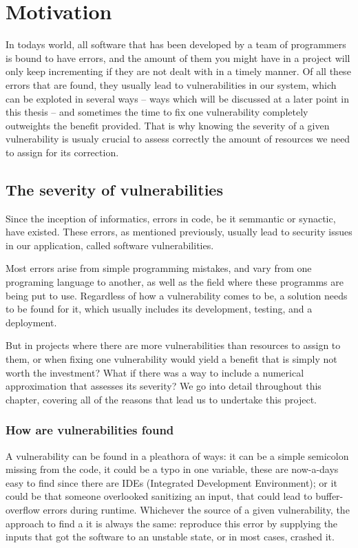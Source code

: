 
\chapter{Motivation}\label{chapter:Motivation}

In todays world, all software that has been developed by a team of programmers is bound to have errors, and the amount of them you might have in a project will only keep incrementing if they are not dealt with in a timely manner. Of all these errors that are found, they usually lead to vulnerabilities in our system, which can be exploted in several ways -- ways which will be discussed at a later point in this thesis -- and sometimes the time to fix one vulnerability completely outweights the benefit provided. That is why knowing the severity of a given vulnerability is usualy crucial to assess correctly the amount of resources we need to assign for its correction.

\section{The severity of vulnerabilities}
Since the inception of informatics, errors in code, be it semmantic or synactic, have existed. These errors, as mentioned previously, usually lead to security issues in our application, called software vulnerabilities.

Most errors arise from simple programming mistakes, and vary from one programing language to another, as well as the field where these programms are being put to use. Regardless of how a vulnerability comes to be, a solution needs to be found for it, which usually includes its development, testing, and a deployment.

But in projects where there are more vulnerabilities than resources to assign to them, or when fixing one vulnerability would yield a benefit that is simply not worth the investment? What if there was a way to include a numerical approximation that assesses its severity? We go into detail throughout this chapter, covering all of the reasons that lead us to undertake this project.

\subsection{How are vulnerabilities found}

A vulnerability can be found in a pleathora of ways: it can be a simple semicolon missing from the code, it could be a typo in one variable, these are now-a-days easy to find since there are IDEs (Integrated Development Environment); or it could be that someone overlooked sanitizing an input, that could lead to buffer-overflow errors during runtime. Whichever the source of a given vulnerability, the approach to find a it is always the same: reproduce this error by supplying the inputs that got the software to an unstable state, or in most cases, crashed it.

